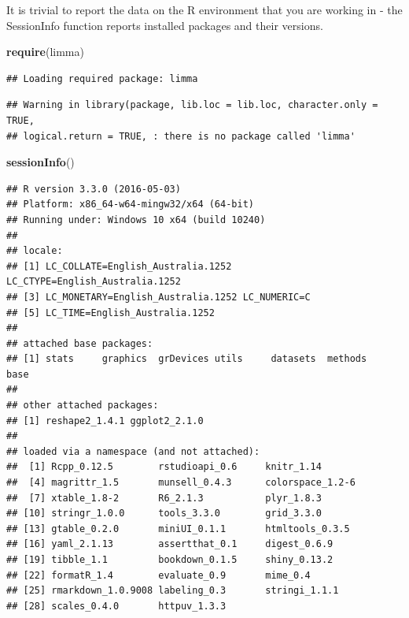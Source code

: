 \documentclass[a4paper]{book}
\newenvironment{Shaded}{\begin{snugshade}}{\end{snugshade}}
\newcommand{\KeywordTok}[1]{\textcolor[rgb]{0.13,0.29,0.53}{\textbf{{#1}}}}
\newcommand{\NormalTok}[1]{{#1}}
\renewenvironment{Shaded}
{\vspace{1.5em}\begin{leftbar}\begin{snugshade}}
{\end{snugshade}\end{leftbar}\vspace{3pt}}
\begin{document}
It is trivial to report the data on the R environment that you are
working in - the SessionInfo function reports installed packages and
their versions.

\begin{Shaded}
\begin{Highlighting}[]
\KeywordTok{require}\NormalTok{(limma)}
\end{Highlighting}
\end{Shaded}

\begin{verbatim}
## Loading required package: limma
\end{verbatim}

\begin{verbatim}
## Warning in library(package, lib.loc = lib.loc, character.only = TRUE,
## logical.return = TRUE, : there is no package called 'limma'
\end{verbatim}

\begin{Shaded}
\begin{Highlighting}[]
\KeywordTok{sessionInfo}\NormalTok{()}
\end{Highlighting}
\end{Shaded}

\begin{verbatim}
## R version 3.3.0 (2016-05-03)
## Platform: x86_64-w64-mingw32/x64 (64-bit)
## Running under: Windows 10 x64 (build 10240)
## 
## locale:
## [1] LC_COLLATE=English_Australia.1252  LC_CTYPE=English_Australia.1252   
## [3] LC_MONETARY=English_Australia.1252 LC_NUMERIC=C                      
## [5] LC_TIME=English_Australia.1252    
## 
## attached base packages:
## [1] stats     graphics  grDevices utils     datasets  methods   base     
## 
## other attached packages:
## [1] reshape2_1.4.1 ggplot2_2.1.0 
## 
## loaded via a namespace (and not attached):
##  [1] Rcpp_0.12.5        rstudioapi_0.6     knitr_1.14        
##  [4] magrittr_1.5       munsell_0.4.3      colorspace_1.2-6  
##  [7] xtable_1.8-2       R6_2.1.3           plyr_1.8.3        
## [10] stringr_1.0.0      tools_3.3.0        grid_3.3.0        
## [13] gtable_0.2.0       miniUI_0.1.1       htmltools_0.3.5   
## [16] yaml_2.1.13        assertthat_0.1     digest_0.6.9      
## [19] tibble_1.1         bookdown_0.1.5     shiny_0.13.2      
## [22] formatR_1.4        evaluate_0.9       mime_0.4          
## [25] rmarkdown_1.0.9008 labeling_0.3       stringi_1.1.1     
## [28] scales_0.4.0       httpuv_1.3.3
\end{verbatim}
\end{document}
